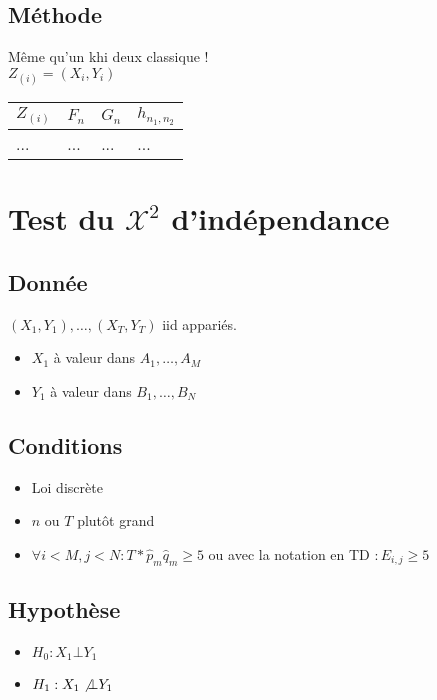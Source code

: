 \documentclass{article}
\theoremstyle{plain}%
\theoremstyle{definition}
\theoremstyle{remark}
\begin{document}
\subsection*{Méthode}
Même qu'un khi deux classique !\\
$ Z_{(i)} = (X_i, Y_i) $ 
\begin{table}[!t]
    \centering
    \begin{tabular}{|l|l|l|l|}
    \hline
        $Z_{(i)}$ & $F_n$ & $G_n$ & $h_{n_1, n_2}$ \\ \hline
        ... & ... & ... & ... \\ \hline
    \end{tabular}
\end{table}

\section{Test du $ \mathcal{X}^2 $ d'indépendance}
\subsection*{Donnée}
    $ (X_1, Y_1), \dots, (X_T, Y_T) $ iid appariés. \begin{itemize}
        \item $ X_1 $ à valeur dans $ A_1, \dots, A_M $ 
        \item $ Y_1 $ à valeur dans $ B_1, \dots, B_N $ 
    \end{itemize}

\subsection*{Conditions}
    \begin{itemize}
        \item Loi discrète 
        \item $ n $ ou $ T $  plutôt grand
        \item $ \forall i < M, j < N : T*\hat{p}_m \hat{q}_m \geq 5 $ ou avec la notation en TD $ :E_{i,j} \geq 5 $ 
    \end{itemize}

\subsection*{Hypothèse}
    \begin{itemize}
        \item $ H_0: X_1 \bot Y_1 $
        \item $ H_1: X_1 \not\bot Y_1 $
    \end{itemize}
\end{document}
